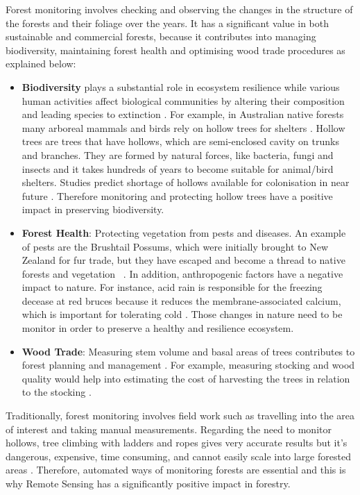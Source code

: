 \documentclass{subfiles}
\begin{document}
Forest monitoring {\color{blue} involves checking and observing the changes in the structure of the forests and their foliage over the years. It has a significant value in both sustainable and commercial forests, because it contributes} into managing biodiversity, maintaining forest health and optimising wood trade procedures as explained below: 
\begin{itemize}
 \item \textbf{Biodiversity} plays a substantial role in ecosystem resilience \cite{Elmqvist2003} while various human activities affect biological communities by altering their composition and leading species to extinction \cite{Hooper2005}.  For example, in Australian native forests many arboreal mammals and birds rely on hollow trees for shelters \cite{Lindenmayer2010} {\color{blue}. Hollow trees are trees that have hollows, which are semi-enclosed cavity on trunks and branches. They are formed by natural forces, like bacteria, fungi and insects and it takes hundreds of years to become suitable for animal/bird shelters. Studies} predict shortage of hollows available for colonisation in near future \cite{Goldingay2009}\cite{Gibbons2002}. Therefore monitoring  and protecting hollow trees have a positive impact in preserving biodiversity.
 
 \item \textbf{Forest Health}: Protecting vegetation from pests and diseases. An example of pests are the Brushtail Possums, which were initially brought to New Zealand for fur trade, but they have escaped and become a thread to native forests and vegetation ~\cite{DepartementOfConversation2014}. In addition, anthropogenic factors have a negative impact to nature. For instance, acid rain is responsible for the freezing decease at red bruces because it reduces the membrane-associated calcium, which is important for tolerating cold 
 \cite{DeHayes1999}. Those changes in nature need to be monitor in order to preserve a healthy and resilience ecosystem. 

 
 \item \textbf{Wood Trade}:  Measuring stem volume and basal areas of trees contributes to forest planning and management \cite{Holmgren2004}. For example, measuring stocking and wood quality would help into estimating the cost of harvesting the trees in relation to the stocking \cite{Susana2015}.
 
\end{itemize}
 
{\color{blue}Traditionally, forest monitoring involves field work such as travelling into the area of interest and taking manual measurements. Regarding the need to monitor hollows}, tree climbing with ladders and ropes gives very accurate results but it's dangerous, expensive, time consuming, and cannot easily scale into large forested areas \cite{Harper2004}\cite{Rayner2011}. Therefore, automated ways of monitoring forests are essential and this is why Remote Sensing has a significantly positive impact in forestry. 
 
\end{document}
